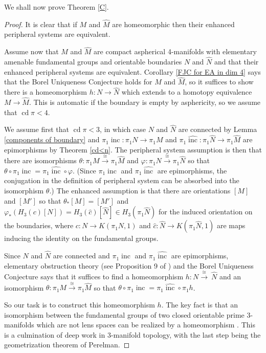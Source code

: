 \documentclass[12pt]{amsart}
\theoremstyle{definition}
\DeclareMathOperator{\cd}{cd}
\DeclareMathOperator{\inc}{inc}
\newcommand{\wh}[1]{{\widehat{#1}}}
\begin{document}
We shall now prove Theorem \ref{C}.

\begin{proof} It is clear that if $M$ and $\wh M$ are homeomorphic then their enhanced peripheral systems are equivalent.

Assume now that $M$ and $\wh M$  are compact aspherical 4-manifolds with elementary amenable fundamental groups and orientable boundaries $N$ and $\wh N$ and that their enhanced peripheral systems are equivalent.   
Corollary \ref{FJC for EA in dim 4}
says that the Borel Uniqueness Conjecture holds for $M$ and $\wh M$, so it suffices to show there is a homeomorphism $h : N \to \wh N$ which extends to a homotopy equivalence $M \to \wh M$.   This is automatic if the boundary is empty by asphericity, so we assume that $\cd \pi <4$.

We assume first that $\cd \pi <3$, in which case $N$ and $\wh N$ are
connected by Lemma \ref{components of boundary} and  $\pi_1\! \inc : \pi_1 N \to \pi_1 M$ and   $\pi_1 \wh \inc : \pi_1 \wh N \to \pi_1 \wh M$ are epimorphisms by Theorem \ref{cd<n}.  The   peripheral system assumption is then that there are isomorphisms 
$\theta : \pi_1 M \xrightarrow{\cong} \pi_1 \wh M$ and $\varphi : \pi_1 N \xrightarrow{\cong} \pi_1 \wh N$ so that 
$\theta \circ  \pi_1\!\inc=\pi_1\wh \inc  \circ \varphi$.  (Since $\pi_1\!\inc$ and $\pi_1\wh \inc$ are epimorphisms, 
the conjugation in the definition of peripheral system can be absorbed into 
the isomorphism $\theta$.)  The enhanced assumption is that there are orientations $[M]$ and  $[M']$ so that $\theta_*[M] = [M']$ 
and $\varphi_*(H_3(c)[N]) = H_3(\wh c)[\wh N] \in H_3(\pi_1 \wh N)$ for the induced  orientation on the boundaries, 
where  $c : N \to K(\pi_1N,1)$ and $\wh c : \wh N \to K(\pi_1\wh N,1)$ are maps inducing the identity on the fundamental groups.


Since $N$ and $\wh N$ are connected and $\pi_1\!\inc$ and $\pi_1\wh\inc$ are epimorphisms,  elementary obstruction theory (see Proposition 9 of \cite{dh1}) and the Borel Uniqueness Conjecture says that it suffices to find a homeomorphism $h :N \xrightarrow{\cong} \ \wh N$ and an isomorphism $\theta : \pi_1 M \xrightarrow{\cong} \pi_1 \wh M$  so that $\theta \circ  \pi_1\!\inc=\pi_1\wh \inc  \circ \pi_1 h$.

So our task is to construct this homeomorphism $h$.  The key fact is that an isomorphism between
the fundamental groups of two closed orientable prime 3-manifolds which are not lens spaces can be realized by a homeomorphism \cite[Theorem 1.4.3]{BBBMP}.   This is a culmination of 
deep work in 3-manifold topology, with the last step being the geometrization theorem of Perelman.


\end{proof}
\end{document}
